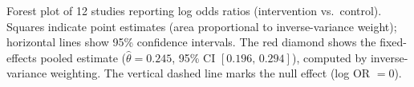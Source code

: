 \caption{Forest plot of 12 studies reporting log odds ratios (intervention vs.\ control).
Squares indicate point estimates (area proportional to inverse-variance weight);
horizontal lines show 95\% confidence intervals.
The red diamond shows the fixed-effects pooled estimate
($\hat{\theta} = 0.245$, 95\% CI $[0.196,\, 0.294]$),
computed by inverse-variance weighting.
The vertical dashed line marks the null effect (log OR $= 0$).}
